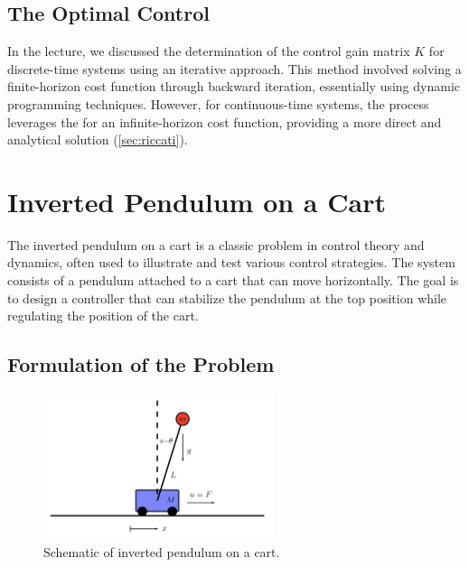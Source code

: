 \documentclass[a4 paper]{article}
\begin{document}
\subsection{The Optimal Control}
In the lecture, we discussed the determination of the control gain matrix \( K \) for discrete-time systems using an iterative approach. 
This method involved solving a finite-horizon cost function through backward iteration, essentially using dynamic programming techniques. 
However, for continuous-time systems, the process leverages the  for an infinite-horizon cost function, 
providing a more direct and analytical solution (\ref{sec:riccati}).





\section{Inverted Pendulum on a Cart}


The inverted pendulum on a cart is a classic problem in control theory and dynamics, often used to illustrate and test various control strategies. 
The system consists of a pendulum attached to a cart that can move horizontally. 
The goal is to design a controller that can stabilize the pendulum at the top position while regulating the position of the cart.

\subsection{Formulation of the Problem}

\begin{figure}[H]
    \centering
    \includegraphics[width=0.6\textwidth]{./figs/inverted_pendulum_on_a_cart.png}
    \caption{Schematic of inverted pendulum on a cart.}
\end{figure}
\end{document}
